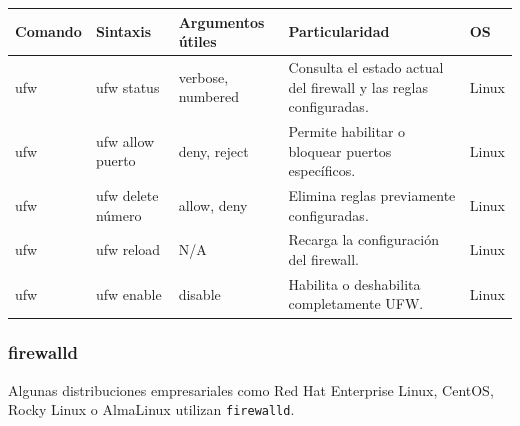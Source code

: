 \documentclass[a4paper,10pt]{article}
\begin{document}
\begin{longtable}{|p{2.8cm}|p{3cm}|p{4cm}|p{5.6cm}|p{1.5cm}|}

\hline
Comando &
Sintaxis &
Argumentos útiles &
Particularidad &
OS
\\
\hline
\endhead

ufw &
ufw status &
verbose, numbered &
Consulta el estado actual del firewall y las reglas configuradas. &
Linux
\\
\hline

ufw &
ufw allow puerto &
deny, reject &
Permite habilitar o bloquear puertos específicos. &
Linux
\\
\hline

ufw &
ufw delete número &
allow, deny &
Elimina reglas previamente configuradas. &
Linux
\\
\hline

ufw &
ufw reload &
N/A &
Recarga la configuración del firewall. &
Linux
\\
\hline

ufw &
ufw enable &
disable &
Habilita o deshabilita completamente UFW. &
Linux
\\
\hline

\end{longtable}





\subsubsection{firewalld}

Algunas distribuciones empresariales como Red Hat Enterprise Linux,
CentOS, Rocky Linux o AlmaLinux utilizan \texttt{firewalld}.
\end{document}
